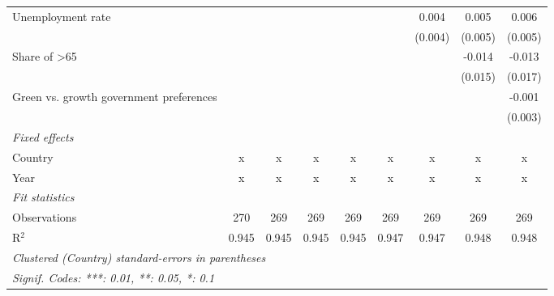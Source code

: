 \begin{table}[htbp]
\begin{tabular}{lcccccccc}
      Unemployment rate                                                  &         &         &         &         &         & 0.004   & 0.005   & 0.006\\   
                                                                         &         &         &         &         &         & (0.004) & (0.005) & (0.005)\\   
      Share of >65                                                       &         &         &         &         &         &         & -0.014  & -0.013\\   
                                                                         &         &         &         &         &         &         & (0.015) & (0.017)\\   
      Green vs. growth government preferences                            &         &         &         &         &         &         &         & -0.001\\   
                                                                         &         &         &         &         &         &         &         & (0.003)\\   
      \emph{Fixed effects}\\
      Country                                                            & x       & x       & x       & x       & x       & x       & x       & x\\  
      Year                                                               & x       & x       & x       & x       & x       & x       & x       & x\\  
      \midrule \emph{Fit statistics}\\
      Observations                                                       & 270     & 269     & 269     & 269     & 269     & 269     & 269     & 269\\  
      R$^2$                                                              & 0.945   & 0.945   & 0.945   & 0.945   & 0.947   & 0.947   & 0.948   & 0.948\\  
      \midrule
      \multicolumn{9}{l}{\emph{Clustered (Country) standard-errors in parentheses}}\\
      \multicolumn{9}{l}{\emph{Signif. Codes: ***: 0.01, **: 0.05, *: 0.1}}\\
   \end{tabular}
\end{table}


